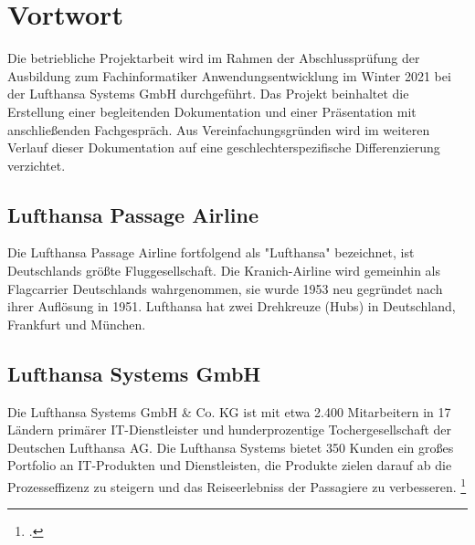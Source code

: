 \section{Vortwort}

	Die betriebliche Projektarbeit wird im Rahmen der Abschlussprüfung der Ausbildung zum
	Fachinformatiker Anwendungsentwicklung im Winter 2021 bei der Lufthansa Systems GmbH durchgeführt.
	Das Projekt beinhaltet die Erstellung einer begleitenden
	Dokumentation und einer Präsentation mit anschließenden Fachgespräch. Aus Vereinfachungsgründen wird im weiteren Verlauf dieser Dokumentation auf eine geschlechterspezifische
	Differenzierung verzichtet.


	\subsection{Lufthansa Passage Airline}
	Die Lufthansa Passage Airline fortfolgend als "Lufthansa" bezeichnet, ist Deutschlands größte Fluggesellschaft. Die Kranich-Airline wird gemeinhin als Flagcarrier Deutschlands wahrgenommen, sie wurde 1953 neu gegründet nach ihrer Auflösung in 1951. Lufthansa hat zwei Drehkreuze (Hubs) in Deutschland, Frankfurt und München.

	\subsection{Lufthansa Systems GmbH}
	Die Lufthansa Systems GmbH \& Co. KG ist mit etwa 2.400 Mitarbeitern in 17 Ländern primärer IT-Dienstleister und hunderprozentige Tochergesellschaft der Deutschen Lufthansa AG.
	Die Lufthansa Systems bietet 350 Kunden ein großes Portfolio an IT-Produkten und Dienstleisten, die Produkte zielen darauf ab die Prozesseffizenz zu steigern und das Reiseerlebniss der Passagiere zu verbesseren.
	\footcite{1}

